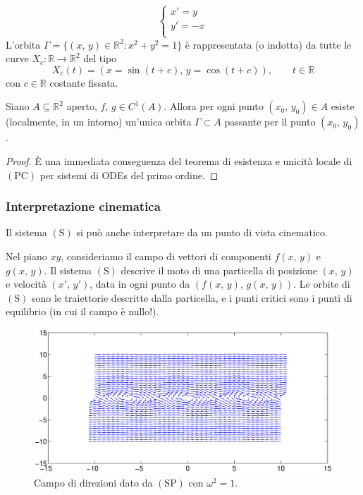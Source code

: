 \begin{example}
$$
\begin{cases}
x' = y\\
y' = -x\\
\end{cases}
$$
L'orbita $\Gamma = \lbrace (x,\,y) \in \mathbb{R}^2 : x^2 + y^2 = 1 \rbrace$ è rappresentata (o indotta) da tutte le curve $X_c : \mathbb{R} \longrightarrow 	\mathbb{R}^2$ del tipo
$$
X_c(t) = \left( x = \sin(t+c) ,\, y = \cos(t+c) \right), \qquad t \in \mathbb{R}
$$
con $c \in \mathbb{R}$ costante fissata.
\end{example}

\begin{cor}
Siano $A \subseteq \mathbb{R}^2$ aperto, $f,\,g \in C^1(A)$. Allora per ogni punto $(x_0,\,y_0) \in A$ esiste (localmente, in un intorno) un'unica orbita $\Gamma \subset A$ passante per il punto $(x_0,\,y_0)$.
\end{cor}
\begin{proof}
\`E una immediata conseguenza del teorema di esistenza e unicità locale di $\mathrm{(PC)}$ per sistemi di ODEs del primo ordine.
\end{proof}



\subsubsection{Interpretazione cinematica}
Il sistema $\mathrm{(S)}$ si può anche interpretare da un punto di vista cinematico.

Nel piano $xy$, consideriamo il campo di vettori di componenti $f(x,\,y)$ e $g(x,\,y)$. Il sistema $\mathrm{(S)}$ descrive il moto di una particella di posizione $(x,\,y)$ e velocità $(x',\,y')$, data in ogni punto da $\left( f(x,\,y) ,\, g(x,\,y) \right)$. Le orbite di $\mathrm{(S)}$ sono le traiettorie descritte dalla particella, e i punti critici sono i punti di equilibrio (in cui il campo è nullo!).

\begin{figure}[H]
\begin{center}
\includegraphics[width=1.0\textwidth]{campo_direzioni_pendolo.eps}
\caption{Campo di direzioni dato da $\mathrm{(SP)}$ con $\omega^2 = 1$.}
\label{T_vs_M}
\end{center}
\end{figure}


